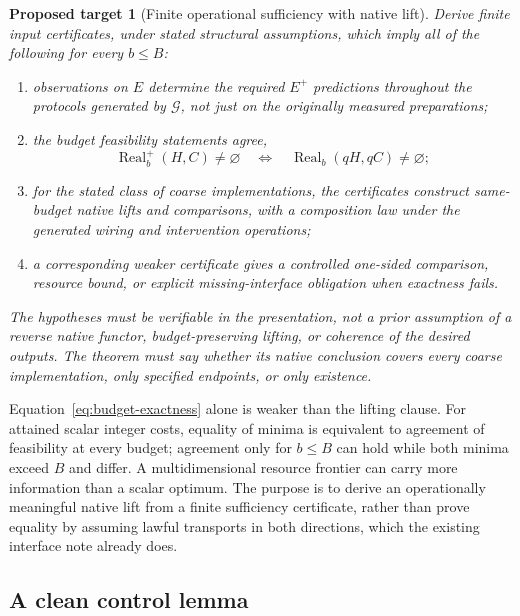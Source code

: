 \documentclass[11pt]{article}
\newtheorem{target}[definition]{Proposed target}
\theoremstyle{remark}
\newcommand{\Real}{\operatorname{Real}}
\begin{document}
\begin{target}[Finite operational sufficiency with native lift]
\label{target:finite}
Derive finite input certificates, under stated structural assumptions, which imply all of the following for every $b\leq B$:
\begin{enumerate}
\item observations on $E$ determine the required $E^+$ predictions throughout the protocols generated by $\mathcal G$, not just on the originally measured preparations;
\item the budget feasibility statements agree,
\begin{equation}
 \Real^+_b(H,C)\ne\varnothing
 \quad\Longleftrightarrow\quad
 \Real_b(qH,qC)\ne\varnothing;
 \label{eq:budget-exactness}
\end{equation}
\item for the stated class of coarse implementations, the certificates construct same-budget native lifts and comparisons, with a composition law under the generated wiring and intervention operations;
\item a corresponding weaker certificate gives a controlled one-sided comparison, resource bound, or explicit missing-interface obligation when exactness fails.
\end{enumerate}
The hypotheses must be verifiable in the presentation, not a prior assumption of a reverse native functor, budget-preserving lifting, or coherence of the desired outputs. The theorem must say whether its native conclusion covers every coarse implementation, only specified endpoints, or only existence.
\end{target}

Equation~\eqref{eq:budget-exactness} alone is weaker than the lifting clause. For attained scalar integer costs, equality of minima is equivalent to agreement of feasibility at every budget; agreement only for $b\leq B$ can hold while both minima exceed $B$ and differ. A multidimensional resource frontier can carry more information than a scalar optimum. The purpose is to derive an operationally meaningful native lift from a finite sufficiency certificate, rather than prove equality by assuming lawful transports in both directions, which the existing interface note already does.

\subsection{A clean control lemma}
\end{document}
